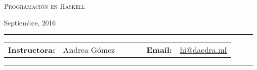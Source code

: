 \documentclass[11pt, letter-paper]{article}
\begin{document}
\begin{center}
{\Large \textsc{Programación en Haskell}}
\end{center}
\begin{center}
Septiembre, 2016
\end{center}

\begin{center}
\rule{6in}{0.4pt}
\begin{minipage}[t]{.75\textwidth}
\begin{tabular}{llcccll}
\textbf{Instructora:} & Andrea Gómez & & & &
\textbf{Email:} &  \href{mailto:hi@daedra.ml}{hi@daedra.ml}
\end{tabular}
\end{minipage}
\rule{6in}{0.4pt}
\end{center}
\vspace{.5cm}
\setlength{\unitlength}{1in}
\renewcommand{\arraystretch}{2}
\end{document}
